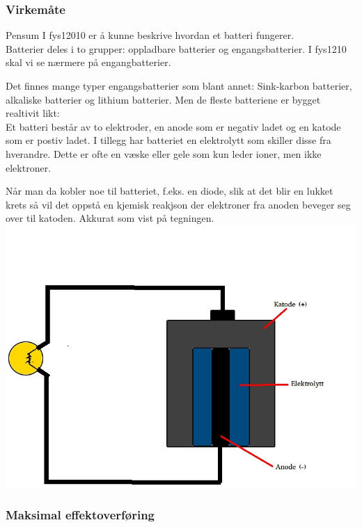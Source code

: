 \subsubsection{Virkemåte}
Pensum I fys12010 er å kunne beskrive hvordan et batteri fungerer.
\\

Batterier deles i to grupper: oppladbare batterier og engangsbatterier.
I fys1210 skal vi se nærmere på engangbatterier.

Det finnes mange typer engangsbatterier som blant annet:
Sink-karbon batterier, alkaliske batterier og lithium batterier.
Men de fleste batteriene er bygget realtivit likt:
\\

Et batteri består av to elektroder,
en anode som er negativ ladet og en katode som er postiv ladet.
I tillegg har batteriet en elektrolytt som skiller disse fra hverandre.
Dette er ofte en væske eller gele som kun leder ioner, men ikke elektroner.

Når man da kobler noe til batteriet, f.eks. en diode,
slik at det blir en lukket krets
så vil det oppstå en kjemisk reakjson
der elektroner fra anoden beveger seg over til katoden.
Akkurat som vist på tegningen.
\\
\includegraphics[width=\textwidth]{./img/batteri}

\subsubsection{Maksimal effektoverføring}

